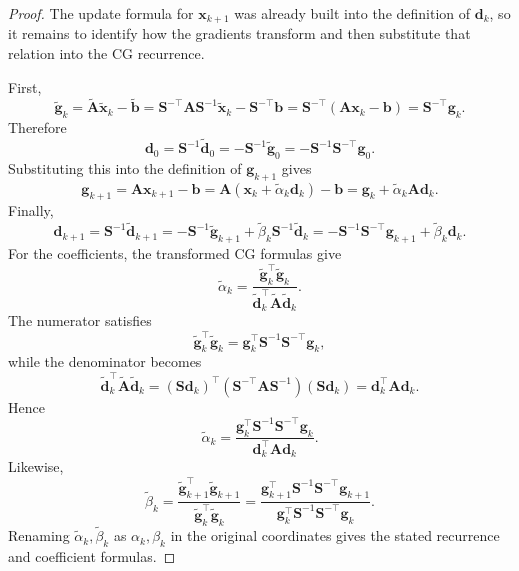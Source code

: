 \begin{proof}
The update formula for $\mathbf{x}_{k+1}$ was already built into the definition
of $\mathbf{d}_k$, so it remains to identify how the gradients transform and
then substitute that relation into the CG recurrence.

\noindent First,
\[
  \tilde{\mathbf{g}}_k
  =\tilde{\mathbf{A}}\tilde{\mathbf{x}}_k-\tilde{\mathbf{b}}
  =\mathbf{S}^{-\top}\mathbf{A}\mathbf{S}^{-1}\tilde{\mathbf{x}}_k
   -\mathbf{S}^{-\top}\mathbf{b}
  =\mathbf{S}^{-\top}(\mathbf{A}\mathbf{x}_k-\mathbf{b})
  =\mathbf{S}^{-\top}\mathbf{g}_k.
\]
Therefore
\[
  \mathbf{d}_0
  =\mathbf{S}^{-1}\tilde{\mathbf{d}}_0
  =-\mathbf{S}^{-1}\tilde{\mathbf{g}}_0
  =-\mathbf{S}^{-1}\mathbf{S}^{-\top}\mathbf{g}_0.
\]
Substituting this into the definition of $\mathbf{g}_{k+1}$ gives
\[
  \mathbf{g}_{k+1}
  =\mathbf{A}\mathbf{x}_{k+1}-\mathbf{b}
  =\mathbf{A}(\mathbf{x}_k+\tilde{\alpha}_k \mathbf{d}_k)-\mathbf{b}
  =\mathbf{g}_k+\tilde{\alpha}_k \mathbf{A}\mathbf{d}_k.
\]
Finally,
\[
  \mathbf{d}_{k+1}
  =\mathbf{S}^{-1}\tilde{\mathbf{d}}_{k+1}
  =-\mathbf{S}^{-1}\tilde{\mathbf{g}}_{k+1}+\tilde{\beta}_k \mathbf{S}^{-1}\tilde{\mathbf{d}}_k
  =-\mathbf{S}^{-1}\mathbf{S}^{-\top}\mathbf{g}_{k+1}+\tilde{\beta}_k \mathbf{d}_k.
\]
\noindent For the coefficients, the transformed CG formulas give
\[
  \tilde{\alpha}_k
  =\frac{\tilde{\mathbf{g}}_k^{\top}\tilde{\mathbf{g}}_k}
  {\tilde{\mathbf{d}}_k^{\top}\tilde{\mathbf{A}}\tilde{\mathbf{d}}_k}.
\]
The numerator satisfies
\[
  \tilde{\mathbf{g}}_k^{\top}\tilde{\mathbf{g}}_k
  =\mathbf{g}_k^{\top}\mathbf{S}^{-1}\mathbf{S}^{-\top}\mathbf{g}_k,
\]
while the denominator becomes
\[
  \tilde{\mathbf{d}}_k^{\top}\tilde{\mathbf{A}}\tilde{\mathbf{d}}_k
  =(\mathbf{S}\mathbf{d}_k)^{\top}
   (\mathbf{S}^{-\top}\mathbf{A}\mathbf{S}^{-1})
   (\mathbf{S}\mathbf{d}_k)
  =\mathbf{d}_k^{\top}\mathbf{A}\mathbf{d}_k.
\]
Hence
\[
  \tilde{\alpha}_k
  =\frac{\mathbf{g}_k^{\top}\mathbf{S}^{-1}\mathbf{S}^{-\top}\mathbf{g}_k}
  {\mathbf{d}_k^{\top}\mathbf{A}\mathbf{d}_k}.
\]
Likewise,
\[
  \tilde{\beta}_k
  =\frac{\tilde{\mathbf{g}}_{k+1}^{\top}\tilde{\mathbf{g}}_{k+1}}
  {\tilde{\mathbf{g}}_k^{\top}\tilde{\mathbf{g}}_k}
  =\frac{\mathbf{g}_{k+1}^{\top}\mathbf{S}^{-1}\mathbf{S}^{-\top}\mathbf{g}_{k+1}}
  {\mathbf{g}_k^{\top}\mathbf{S}^{-1}\mathbf{S}^{-\top}\mathbf{g}_k}.
\]
Renaming $\tilde{\alpha}_k,\tilde{\beta}_k$ as $\alpha_k,\beta_k$ in the
original coordinates gives the stated recurrence and coefficient formulas.
\end{proof}

